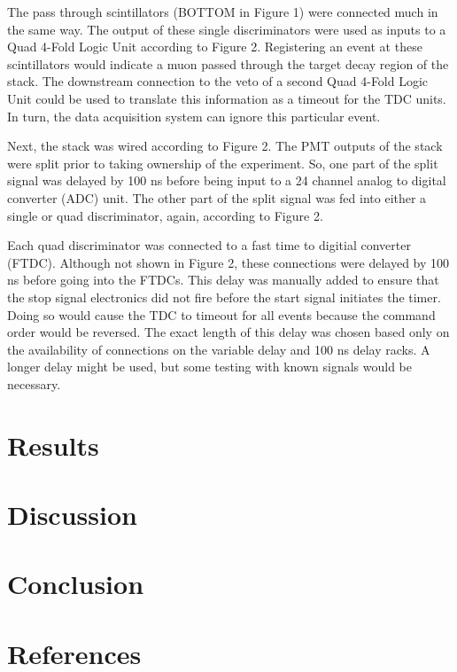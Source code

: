 \documentclass{article}
\begin{document}
The pass through scintillators (BOTTOM in Figure 1) were connected much in the same way. The output of these single discriminators were used as inputs to a Quad 4-Fold Logic Unit according to Figure 2. Registering an event at these scintillators would indicate a muon passed through the target decay region of the stack. The downstream connection to the veto of a second Quad 4-Fold Logic Unit could be used to translate this information as a timeout for the TDC units. In turn, the data acquisition system can ignore this particular event.

Next, the stack was wired according to Figure 2. The PMT outputs of the stack were split prior to taking ownership of the experiment. So, one part of the split signal was delayed by 100 ns before being input to a 24 channel analog to digital converter (ADC) unit. The other part of the split signal was fed into either a single or quad discriminator, again, according to Figure 2. 

Each quad discriminator was connected to a fast time to digitial converter (FTDC). Although not shown in Figure 2, these connections were delayed by 100 ns before going into the FTDCs. This delay was manually added to ensure that the stop signal electronics did not fire before the start signal initiates the timer. Doing so would cause the TDC to timeout for all events because the command order would be reversed. The exact length of this delay was chosen based only on the availability of connections on the variable delay and 100 ns delay racks. A longer delay might be used, but some testing with known signals would be necessary.



\section*{Results}

\section*{Discussion}

\section*{Conclusion}

\section*{References}
\end{document}
